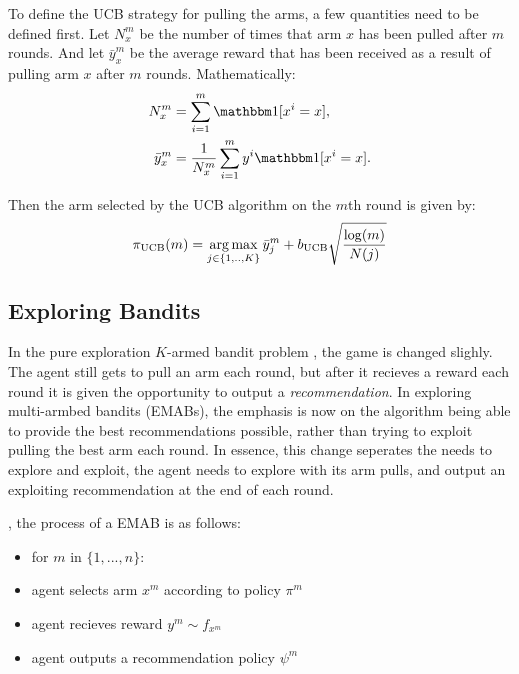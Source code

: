     To define the UCB strategy for pulling the arms, a few quantities need to be defined first. Let $N^m_x$ be the number of times that arm $x$ has been pulled after $m$ rounds. And let $\bar{y}^m_x$ be the average reward that has been received as a result of pulling arm $x$ after $m$ rounds. Mathematically:
    \begin{align}
        N^m_x &= \sum_{i=1}^m \one[x^i = x], \label{eq:mab_num_arm_pulls_def} \\
        \bar{y}^m_x &= \frac{1}{N^m_x} \sum_{i=1}^m y^i \one[x^i = x]. \label{eq:mab_arm_sample_avg} 
    \end{align}
    

    
    Then the arm selected by the UCB algorithm on the $m$th round is given by:
    \begin{align}
        \pi_{{\textnormal{UCB}}}(m) = \operatorname*{arg\,max}_{j\in\{1,..,K\}} \bar{y}_j^m + b_{{\textnormal{UCB}}} \sqrt{\frac{\log(m)}{N(j)}} 
    \end{align}







    \subsection{Exploring Bandits}
    \label{sec:2-3-1-exploring-mab}

        In the pure exploration $K$-armed bandit problem ,
        the game is changed slighly. The agent still gets to pull an arm each round, but after it recieves a reward each round it is given the opportunity to output a \textit{recommendation}. In exploring multi-armbed bandits (EMABs), the emphasis is now on the algorithm being able to provide the best recommendations possible, rather than trying to exploit pulling the best arm each round. In essence, this change seperates the needs to explore and exploit, the agent needs to explore with its arm pulls, and output an exploiting recommendation at the end of each round.

        , the process of a EMAB is as follows:
        \begin{itemize}
            \item for $m$ in $\{1,...,n\}$:
            \item agent selects arm $x^m$ according to policy $\pi^m$
            \item agent recieves reward $y^m \sim f_{x^m}$
            \item agent outputs a recommendation policy $\psi^m$
        \end{itemize}

